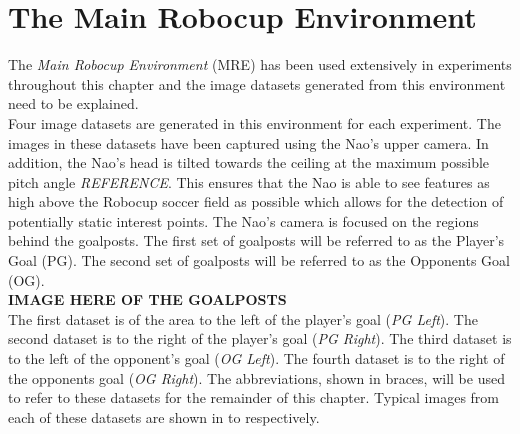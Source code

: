 \documentclass[11pt]{report}
\begin{document}
\section{The Main Robocup Environment}
\label{sec:datasets}
The \textit{Main Robocup Environment} (MRE) has been used extensively in experiments throughout this chapter and the image datasets generated from this environment need to be explained.\\

Four image datasets are generated in this environment for each experiment. The images in these datasets have been captured using the Nao's upper camera. In addition, the Nao's head is tilted towards the ceiling at the maximum possible pitch angle \textit{REFERENCE}. This ensures that the Nao is able to see features as high above the Robocup soccer field as possible which allows for the detection of potentially static interest points. The Nao's camera is focused on the regions behind the goalposts. The first set of goalposts will be referred to as the Player's Goal (PG). The second set of goalposts will be referred to as the Opponents Goal (OG). \\

\textbf{IMAGE HERE OF THE GOALPOSTS}\\

The first dataset is of the area to the left of the player's goal (\textit{PG Left}). The second dataset is to the right of the player's goal (\textit{PG Right}). The third dataset is to the left of the opponent's goal (\textit{OG Left}). The fourth dataset is to the right of the opponents goal (\textit{OG Right}). The abbreviations, shown in braces, will be used to refer to these datasets for the remainder of this chapter. Typical images from each of these datasets are shown in  to  respectively.\\
\end{document}
